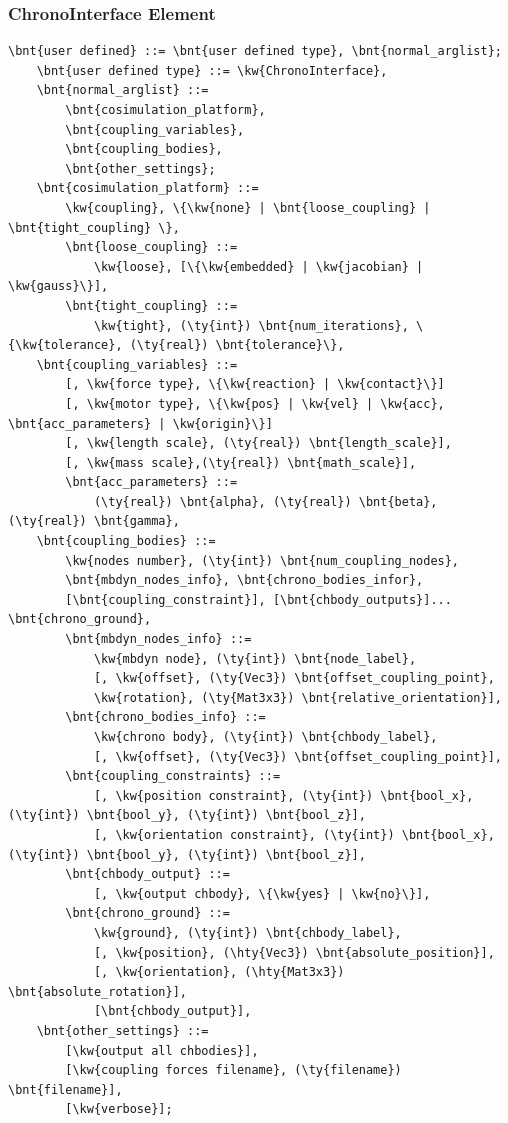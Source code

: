 \subsubsection{ChronoInterface Element}
\begin{Verbatim}[commandchars=\\\{\}]
	\bnt{user defined} ::= \bnt{user defined type}, \bnt{normal_arglist};
	\bnt{user defined type} ::= \kw{ChronoInterface},
	\bnt{normal_arglist} ::= 
		\bnt{cosimulation_platform}, 
		\bnt{coupling_variables}, 
		\bnt{coupling_bodies}, 
		\bnt{other_settings};
	\bnt{cosimulation_platform} ::= 
		\kw{coupling}, \{\kw{none} | \bnt{loose_coupling} | \bnt{tight_coupling} \}, 
		\bnt{loose_coupling} ::= 
			\kw{loose}, [\{\kw{embedded} | \kw{jacobian} | \kw{gauss}\}],
		\bnt{tight_coupling} ::= 
			\kw{tight}, (\ty{int}) \bnt{num_iterations}, \{\kw{tolerance}, (\ty{real}) \bnt{tolerance}\},
	\bnt{coupling_variables} ::= 
		[, \kw{force type}, \{\kw{reaction} | \kw{contact}\}]
		[, \kw{motor type}, \{\kw{pos} | \kw{vel} | \kw{acc}, \bnt{acc_parameters} | \kw{origin}\}]
		[, \kw{length scale}, (\ty{real}) \bnt{length_scale}],
		[, \kw{mass scale},(\ty{real}) \bnt{math_scale}],
		\bnt{acc_parameters} ::=
			(\ty{real}) \bnt{alpha}, (\ty{real}) \bnt{beta}, (\ty{real}) \bnt{gamma},
	\bnt{coupling_bodies} ::= 
		\kw{nodes number}, (\ty{int}) \bnt{num_coupling_nodes}, 
		\bnt{mbdyn_nodes_info}, \bnt{chrono_bodies_infor}, 
		[\bnt{coupling_constraint}], [\bnt{chbody_outputs}]... \bnt{chrono_ground},
		\bnt{mbdyn_nodes_info} ::= 
			\kw{mbdyn node}, (\ty{int}) \bnt{node_label}, 
			[, \kw{offset}, (\ty{Vec3}) \bnt{offset_coupling_point}, 
			\kw{rotation}, (\ty{Mat3x3}) \bnt{relative_orientation}],
		\bnt{chrono_bodies_info} ::= 
			\kw{chrono body}, (\ty{int}) \bnt{chbody_label},
			[, \kw{offset}, (\ty{Vec3}) \bnt{offset_coupling_point}],
		\bnt{coupling_constraints} ::= 
			[, \kw{position constraint}, (\ty{int}) \bnt{bool_x}, (\ty{int}) \bnt{bool_y}, (\ty{int}) \bnt{bool_z}],
			[, \kw{orientation constraint}, (\ty{int}) \bnt{bool_x}, (\ty{int}) \bnt{bool_y}, (\ty{int}) \bnt{bool_z}],
		\bnt{chbody_output} ::= 
			[, \kw{output chbody}, \{\kw{yes} | \kw{no}\}],
		\bnt{chrono_ground} ::= 
			\kw{ground}, (\ty{int}) \bnt{chbody_label}, 
			[, \kw{position}, (\hty{Vec3}) \bnt{absolute_position}],
			[, \kw{orientation}, (\hty{Mat3x3}) \bnt{absolute_rotation}],
			[\bnt{chbody_output}],
	\bnt{other_settings} ::= 
		[\kw{output all chbodies}], 
		[\kw{coupling forces filename}, (\ty{filename}) \bnt{filename}], 
		[\kw{verbose}];
\end{Verbatim}

